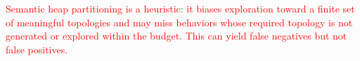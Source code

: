 \documentclass[acmsmall]{acmart}
\newcommand{\rev}[1]{\textcolor{red}{#1}}
\newcommand{\rev}[1]{#1}
\newcommand{\projName}{\textsc{Gordian}\xspace}
\theoremstyle{definition}
\begin{document}
\rev{Semantic heap partitioning is a heuristic: it biases exploration toward a finite set of meaningful topologies and may miss behaviors whose required topology is not generated or explored within the budget. This can yield false negatives but not false positives.}





\end{document}
